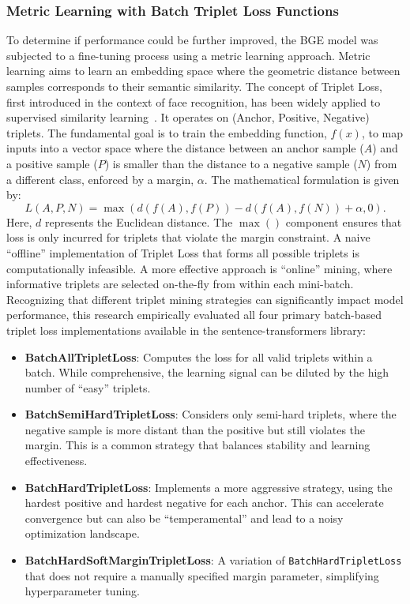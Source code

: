 \subsubsection{Metric Learning with Batch Triplet Loss Functions}\label{ch:3.3.1.2}
To determine if performance could be further improved, the BGE model was subjected to a fine-tuning process using a metric learning approach. Metric learning aims to learn an embedding space where the geometric distance between samples corresponds to their semantic similarity. The concept of Triplet Loss, first introduced in the context of face recognition, has been widely applied to supervised similarity learning~\cite{Yu2020}. It operates on (Anchor, Positive, Negative) triplets. The fundamental goal is to train the embedding function, \(f(x)\), to map inputs into a vector space where the distance between an anchor sample (\(A\)) and a positive sample (\(P\)) is smaller than the distance to a negative sample (\(N\)) from a different class, enforced by a margin, \(\alpha\). The mathematical formulation is given by:
\[ L(A,P,N)=\max(d(f(A),f(P))-d(f(A),f(N))+\alpha,0). \]
Here, \(d\) represents the Euclidean distance. The \(\max()\) component ensures that loss is only incurred for triplets that violate the margin constraint. A naive ``offline'' implementation of Triplet Loss that forms all possible triplets is computationally infeasible. A more effective approach is ``online'' mining, where informative triplets are selected on-the-fly from within each mini-batch. Recognizing that different triplet mining strategies can significantly impact model performance, this research empirically evaluated all four primary batch-based triplet loss implementations available in the sentence-transformers library:
\begin{itemize}
    \item \textbf{BatchAllTripletLoss}: Computes the loss for all valid triplets within a batch. While comprehensive, the learning signal can be diluted by the high number of ``easy'' triplets.
    \item \textbf{BatchSemiHardTripletLoss}: Considers only semi-hard triplets, where the negative sample is more distant than the positive but still violates the margin. This is a common strategy that balances stability and learning effectiveness.
    \item \textbf{BatchHardTripletLoss}: Implements a more aggressive strategy, using the hardest positive and hardest negative for each anchor. This can accelerate convergence but can also be ``temperamental'' and lead to a noisy optimization landscape.
    \item \textbf{BatchHardSoftMarginTripletLoss}: A variation of \verb|BatchHardTripletLoss| that does not require a manually specified margin parameter, simplifying hyperparameter tuning.
\end{itemize}

